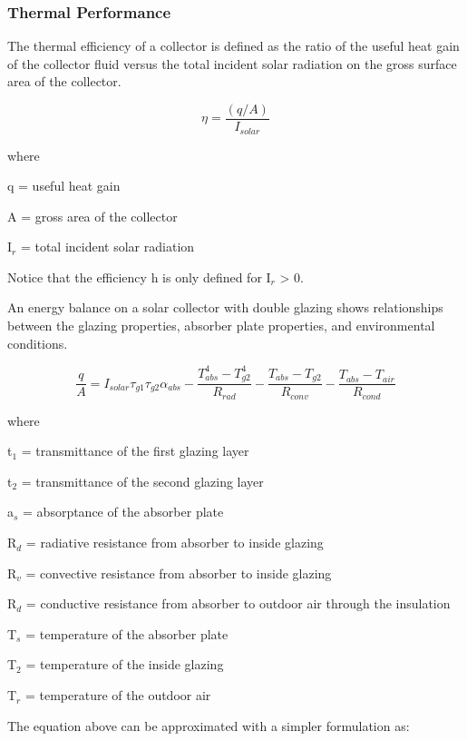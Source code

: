 \subsubsection{Thermal Performance}\label{thermal-performance}

The thermal efficiency of a collector is defined as the ratio of the useful heat gain of the collector fluid versus the total incident solar radiation on the gross surface area of the collector.

\begin{equation}
\eta  = \frac{{(q/A)}}{{{I_{solar}}}}
\end{equation}

where

q = useful heat gain

A = gross area of the collector

I\(_{r}\) = total incident solar radiation

Notice that the efficiency h is only defined for I\(_{r}\) \textgreater{} 0.

An energy balance on a solar collector with double glazing shows relationships between the glazing properties, absorber plate properties, and environmental conditions.

\begin{equation}
\frac{q}{A} = {I_{solar}}{\tau_{g1}}{\tau_{g2}}{\alpha_{abs}} - \frac{{T_{abs}^4 - T_{g2}^4}}{{{R_{rad}}}} - \frac{{{T_{abs}} - {T_{g2}}}}{{{R_{conv}}}} - \frac{{{T_{abs}} - {T_{air}}}}{{{R_{cond}}}}
\end{equation}

where

t\(_{1}\) = transmittance of the first glazing layer

t\(_{2}\) = transmittance of the second glazing layer

a\(_{s}\) = absorptance of the absorber plate

R\(_{d}\) = radiative resistance from absorber to inside glazing

R\(_{v}\) = convective resistance from absorber to inside glazing

R\(_{d}\) = conductive resistance from absorber to outdoor air through the insulation

T\(_{s}\) = temperature of the absorber plate

T\(_{2}\) = temperature of the inside glazing

T\(_{r}\) = temperature of the outdoor air

The equation above can be approximated with a simpler formulation as:

